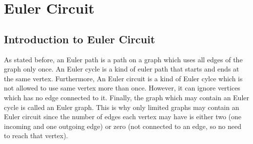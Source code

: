 \documentclass[14pt, times, a4paper]{extarticle}
\begin{document}
\newpage
\section{Euler Circuit}


\subsection{Introduction to Euler Circuit}
As stated before, an \gls{Euler path} is a path on a graph which uses all edges of the graph only once. An Euler cycle is a kind of euler path that starts and ends at the same vertex. Furthermore, An Euler circuit is a kind of Euler cylce which is not allowed to use same vertex more than once. However, it can ignore vertices which has no edge connected to it. Finally, the graph which may contain an Euler cycle is called an Euler graph. This is why only limited graphs may contain an Euler circuit since the number of edges each vertex may have is either two (one incoming and one outgoing edge) or zero (not connected to an edge, so no need to reach that vertex).


\end{document}
